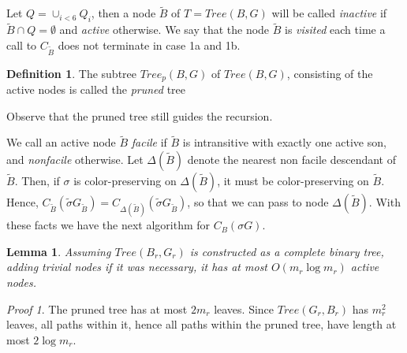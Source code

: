 \documentclass[12pt,a4paper]{book}
\theoremstyle{plain}
\newtheorem{lema}{Lemma}
\theoremstyle{definition}
\newtheorem{definition}{Definition}
\theoremstyle{remark}
\newtheorem*{Proof}{Proof}
\begin{document}
Let $Q= \cup_{i<6} Q_i$, then a node $\tilde{B}$ of $T = Tree(B,G)$ will be called \emph{inactive} if $\tilde{B} \cap Q = \emptyset$ 
and \emph{active} otherwise. We say that the node $\tilde{B}$ is \emph{visited} each time a call to $C_{\tilde{B}}$ does not 
terminate in case 1a and 1b. 

\begin{definition}
 The subtree $Tree_p(B,G)$ of $Tree(B,G)$, consisting of the active nodes is called the \emph{pruned} tree
\end{definition}

Observe that the pruned tree still guides the recursion.

We call an active node $\tilde{B}$ \emph{facile} if $\tilde{B}$ is intransitive with exactly one active son, and \emph{nonfacile} otherwise. 
Let $\Delta ( \tilde{B} )$ denote the nearest non facile descendant of $\tilde{B}$. Then, if $\sigma$ is color-preserving on $\Delta( \tilde{B})$, 
it must be color-preserving on $\tilde{B}$. Hence, $C_{\tilde{B}} (\tilde{\sigma} G_{\tilde{B}}) = C_{\Delta (\tilde{B})} (\tilde{\sigma} G_{\tilde{B}}) $,
 so that we can pass to node $\Delta(\tilde{B})$. With these facts we have the next algorithm for $C_B( \sigma G)$.
 
 \begin{algorithm}
  
 \end{algorithm}

\begin{lema}\label{lema9}
 Assuming $Tree(B_r, G_r)$ is constructed as a complete binary tree, adding trivial nodes if it was necessary, it has at most 
 $O(m_r \log m_r)$ active nodes.
\end{lema}

\begin{Proof}
 The pruned tree has at most $2m_r$ leaves. Since $Tree(G_r, B_r)$ has $m_r^2$ leaves, all paths within it, hence all paths within 
 the pruned tree, have length at most $2 \log m_r$.
\end{Proof}
\end{document}
